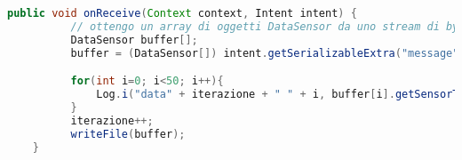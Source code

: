\begin{lstlisting}[language=Java,  basicstyle=\footnotesize]
   public void onReceive(Context context, Intent intent) {
          // ottengo un array di oggetti DataSensor da uno stream di byte
          DataSensor buffer[];
          buffer = (DataSensor[]) intent.getSerializableExtra("message");

          for(int i=0; i<50; i++){
              Log.i("data" + iterazione + " " + i, buffer[i].getSensorType() + " " );
          }
          iterazione++;
          writeFile(buffer);
    }
\end{lstlisting}